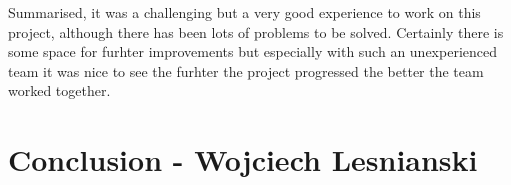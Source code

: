 Summarised, it was a challenging but a very good experience to work on this
project, although there has been lots of problems to be solved. Certainly there
is some space for furhter improvements but especially with such an unexperienced
team it was nice to see the furhter the project progressed the better the team
worked together.

\section{Conclusion - Wojciech Lesnianski} 